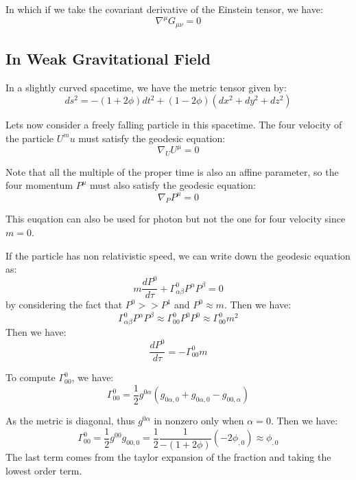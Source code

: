\documentclass{article}
\begin{document}
In which if we take the covariant derivative of the Einstein tensor, we have:
\begin{equation}
\nabla^\mu G_{\mu\nu} = 0
\end{equation}

\subsection{In Weak Gravitational Field}

In a slightly curved spacetime, we have the metric tensor given by:
\begin{equation}
    ds^2=-(1+2\phi)dt^2+(1-2\phi)(dx^2+dy^2+dz^2)
\end{equation}

Lets now consider a freely falling particle in this spacetime. The four velocity of the particle $U^mu$ must satisfy the geodesic equation:
\begin{equation}
    \nabla_U U^\mu = 0
\end{equation}

Note that all the multiple of the proper time is also an affine parameter, so the four momentum $P^\mu$ must also satisfy the geodesic equation:
\begin{equation}
    \nabla_P P^\mu = 0
\end{equation}

This euqation can also be used for photon but not the one for four velocity since $m=0$.

If the particle has non relativistic speed, we can write down the geodesic equation as:
\begin{equation}
    m\frac{dP^0}{d\tau}+\Gamma^0_{\alpha\beta}P^\alpha P^\beta=0
\end{equation} 
by considering the fact that $P^0>>P^1$ and $P^0\approx m$. Then we have:
\begin{equation}
    \Gamma^0_{\alpha\beta}P^\alpha P^\beta\approx \Gamma^0_{00}P^0 P^0\approx \Gamma^0_{00}m^2
\end{equation}
Then we have:
\begin{equation}
    \frac{dP^0}{d\tau}=-\Gamma^0_{00}m
\end{equation}

To compute $\Gamma^0_{00}$, we have:
\begin{equation}
    \Gamma^0_{00}=\frac{1}{2}g^{0\alpha}( g_{0\alpha,0}+ g_{0\alpha,0}- g_{00,\alpha})
\end{equation}

As the metric is diagonal, thus $g^{0\alpha}$ in nonzero only when $\alpha=0$. Then we have:
\begin{equation}
    \Gamma^0_{00}=\frac{1}{2}g^{00} g_{00,0}=\frac{1}{2}\frac{1}{-(1+2\phi)}(-2 \phi_{,0})\approx \phi_{,0}
\end{equation}
The last term comes from the taylor expansion of the fraction and taking the lowest order term.
\end{document}
